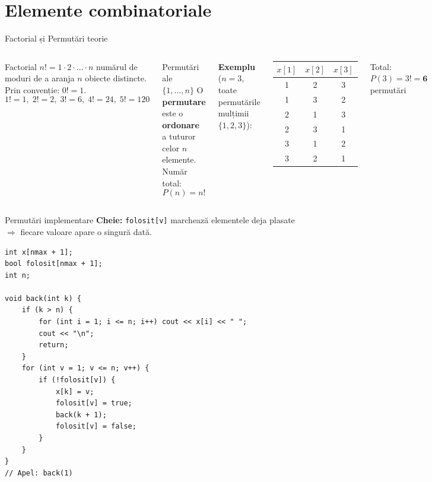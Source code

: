 ﻿\documentclass[10pt]{beamer}
\begin{document}
\section{Elemente combinatoriale}

\begin{frame}{Factorial și Permutări \textemdash{} teorie}
  \begin{columns}[T]
  \begin{block}{Factorial}
    $n! = 1 \cdot 2 \cdot \ldots \cdot n$ \textemdash{} numărul de moduri de a
    aranja $n$ obiecte distincte. Prin convenție: $0! = 1$.
    $$1!=1,\; 2!=2,\; 3!=6,\; 4!=24,\; 5!=120$$
  \end{block}
  \smallskip
  \begin{block}{Permutări ale $\{1,\ldots,n\}$}
    O \textbf{permutare} este o \textbf{ordonare} a tuturor celor $n$ elemente.
    Număr total:
    $$P(n) = n!$$
  \end{block}
  \textbf{Exemplu} ($n = 3$, toate permutările mulțimii $\{1,2,3\}$):
  \smallskip
  \begin{center}
  \begin{tabular}{ccc}
    \toprule
    $x[1]$ & $x[2]$ & $x[3]$ \\
    \midrule
    1 & 2 & 3 \\
    1 & 3 & 2 \\
    2 & 1 & 3 \\
    2 & 3 & 1 \\
    3 & 1 & 2 \\
    3 & 2 & 1 \\
    \bottomrule
  \end{tabular}
  \end{center}
  \smallskip
  Total: $P(3) = 3! = \mathbf{6}$ permutări
  \end{columns}
\end{frame}

\begin{frame}[fragile]{Permutări \textemdash{} implementare}
  \textbf{Cheie:} \texttt{folosit[v]} marchează elementele deja plasate
  $\Rightarrow$ fiecare valoare apare o singură dată.
  \begin{lstlisting}
int x[nmax + 1];
bool folosit[nmax + 1];
int n;

void back(int k) {
    if (k > n) {
        for (int i = 1; i <= n; i++) cout << x[i] << " ";
        cout << "\n";
        return;
    }
    for (int v = 1; v <= n; v++) {
        if (!folosit[v]) {
            x[k] = v;
            folosit[v] = true;
            back(k + 1);
            folosit[v] = false;
        }
    }
}
// Apel: back(1)
  \end{lstlisting}
\end{frame}
\end{document}
